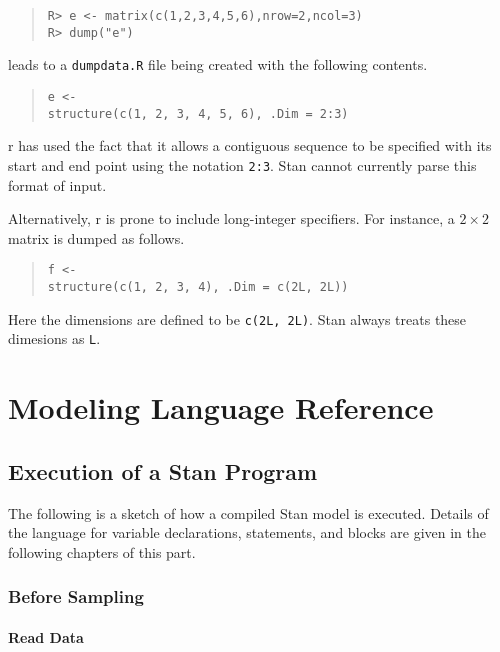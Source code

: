 \documentclass[10pt]{report}
\newcommand{\Stan}{Stan\xspace}
\newcommand{\acronym}[1]{{\sc #1}\xspace}
\newcommand{\R}{\acronym{r}}
\newcommand{\code}[1]{{\tt #1}}
\begin{document}
\begin{quote}
\begin{Verbatim}[fontshape=sl]
R> e <- matrix(c(1,2,3,4,5,6),nrow=2,ncol=3)
R> dump("e")
\end{Verbatim}
\end{quote}
%
leads to a \code{dumpdata.R} file being created with
the following contents.
%
\begin{quote}
\begin{Verbatim}
e <-
structure(c(1, 2, 3, 4, 5, 6), .Dim = 2:3)
\end{Verbatim}
\end{quote}
%
\R has used the fact that it allows a contiguous
sequence to be specified with its start and end point
using the notation \code{2:3}.  \Stan cannot currently
parse this format of input.  

Alternatively, \R is prone to include long-integer specifiers.
For instance, a $2 \times 2$ matrix is dumped as follows.
%
\begin{quote}
\begin{Verbatim}
f <-
structure(c(1, 2, 3, 4), .Dim = c(2L, 2L))
\end{Verbatim}
\end{quote}
%
Here the dimensions are defined to be \code{c(2L,~2L)}.  \Stan 
always treats these dimesions as \code{L}.







\part{Modeling Language Reference}

\chapter{Execution of a \Stan Program}

The following is a sketch of how a compiled \Stan model is executed.
Details of the language for variable declarations, statements, and
blocks are given in the following chapters of this part.

\section{Before Sampling}

\subsection{Read Data}
\end{document}
